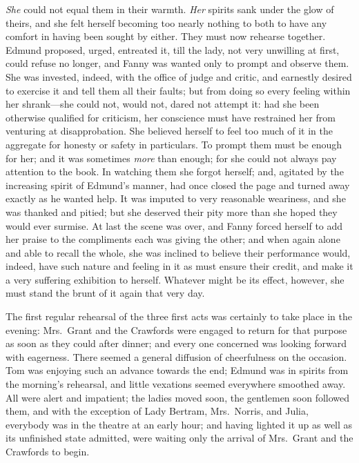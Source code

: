 \emph{She} could not equal them in their warmth.  \emph{Her} spirits
sank under the glow of theirs, and she felt herself becoming
too nearly nothing to both to have any comfort in having
been sought by either.  They must now rehearse together.
Edmund proposed, urged, entreated it, till the lady,
not very unwilling at first, could refuse no longer,
and Fanny was wanted only to prompt and observe them.
She was invested, indeed, with the office of judge and critic,
and earnestly desired to exercise it and tell them all
their faults; but from doing so every feeling within
her shrank---she could not, would not, dared not attempt it:
had she been otherwise qualified for criticism, her conscience
must have restrained her from venturing at disapprobation.
She believed herself to feel too much of it in the aggregate
for honesty or safety in particulars.  To prompt them must
be enough for her; and it was sometimes \emph{more} than enough;
for she could not always pay attention to the book.
In watching them she forgot herself; and, agitated by the
increasing spirit of Edmund's manner, had once closed
the page and turned away exactly as he wanted help.
It was imputed to very reasonable weariness, and she was
thanked and pitied; but she deserved their pity more than
she hoped they would ever surmise.  At last the scene
was over, and Fanny forced herself to add her praise to
the compliments each was giving the other; and when again
alone and able to recall the whole, she was inclined
to believe their performance would, indeed, have such
nature and feeling in it as must ensure their credit,
and make it a very suffering exhibition to herself.
Whatever might be its effect, however, she must stand
the brunt of it again that very day.

The first regular rehearsal of the three first acts
was certainly to take place in the evening:  Mrs.\ Grant
and the Crawfords were engaged to return for that purpose
as soon as they could after dinner; and every one concerned
was looking forward with eagerness.  There seemed
a general diffusion of cheerfulness on the occasion.
Tom was enjoying such an advance towards the end;
Edmund was in spirits from the morning's rehearsal,
and little vexations seemed everywhere smoothed away.
All were alert and impatient; the ladies moved soon,
the gentlemen soon followed them, and with the exception
of Lady Bertram, Mrs.\ Norris, and Julia, everybody was
in the theatre at an early hour; and having lighted it up
as well as its unfinished state admitted, were waiting only
the arrival of Mrs.\ Grant and the Crawfords to begin.

